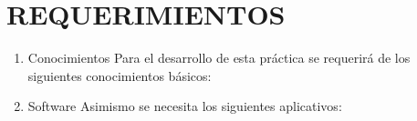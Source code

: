 \section{REQUERIMIENTOS} 

\begin{enumerate}[1.]
	\item Conocimientos
Para el desarrollo de esta práctica se requerirá de los siguientes conocimientos básicos:	
    \item Software
Asimismo se necesita los siguientes aplicativos:

\end{enumerate} 
